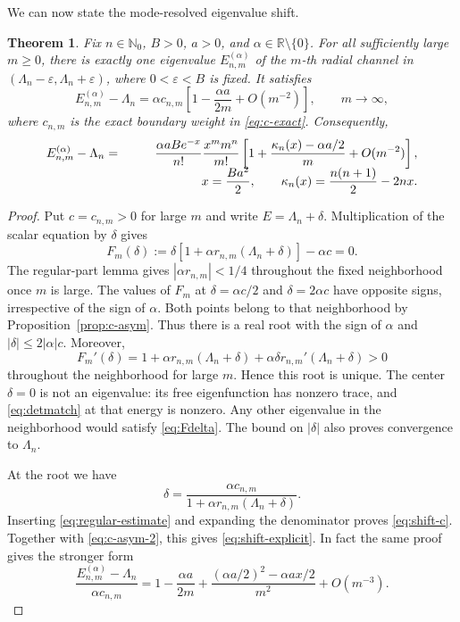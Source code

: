 \documentclass[12pt,a4paper]{article}
\numberwithin{equation}{section}
\newtheorem{thm}{Theorem}[section]
\theoremstyle{remark}
\theoremstyle{definition}
\newcommand{\R}{\mathbb R}
\newcommand{\N}{\mathbb N}
\begin{document}
We can now state the mode-resolved eigenvalue shift.

\begin{thm}\label{thm:shift}
Fix $n\in\N_0$, $B>0$, $a>0$, and $\alpha\in\R\setminus\{0\}$. For all
sufficiently large $m\ge0$, there is exactly one eigenvalue
$E_{n,m}^{(\alpha)}$ of the $m$-th radial channel in
$(\Lambda_n-\varepsilon,\Lambda_n+\varepsilon)$, where
$0<\varepsilon<B$ is fixed. It satisfies
\begin{equation}\label{eq:shift-c}
E_{n,m}^{(\alpha)}-\Lambda_n
=\alpha c_{n,m}
\left[1-\frac{\alpha a}{2m}+O(m^{-2})\right],
\qquad m\to\infty,
\end{equation}
where $c_{n,m}$ is the exact boundary weight in \eqref{eq:c-exact}. Consequently,
\begin{eqnarray}
E_{n,m}^{(\alpha)}-\Lambda_n
&=&\frac{\alpha aB e^{-x}}{n!}
\frac{x^m m^n}{m!}
\left[1+\frac{\kappa_n(x)-\alpha a/2}{m}
+O(m^{-2})\right],\label{eq:shift-explicit}
\\[-2mm]
&&\hspace{20mm} x=\frac{Ba^2}{2},\qquad
\kappa_n(x)=\frac{n(n+1)}2-2nx.\nonumber
\end{eqnarray}
\end{thm}

\begin{proof}
Put $c=c_{n,m}>0$ for large $m$ and write $E=\Lambda_n+\delta$.
Multiplication of the scalar equation by $\delta$ gives
\begin{equation}\label{eq:Fdelta}
F_m(\delta):=\delta[1+\alpha r_{n,m}(\Lambda_n+\delta)]-\alpha c=0.
\end{equation}
The regular-part lemma gives $|\alpha r_{n,m}|<1/4$ throughout the
fixed neighborhood once $m$ is large. The values of $F_m$ at $\delta=\alpha c/2$ and
$\delta=2\alpha c$ have opposite signs, irrespective of the sign of
$\alpha$.
Both points belong to that neighborhood by Proposition~\ref{prop:c-asym}.
Thus there is a real root with the sign of $\alpha$ and
$|\delta|\le2|\alpha|c$. Moreover,
$$
F_m'(\delta)=1+\alpha r_{n,m}(\Lambda_n+\delta)
+\alpha\delta r_{n,m}'(\Lambda_n+\delta)>0
$$
throughout the neighborhood for large $m$. Hence this root is unique.
The center $\delta=0$ is not an eigenvalue: its free eigenfunction has
nonzero trace, and \eqref{eq:detmatch} at that energy is nonzero.
Any other eigenvalue in the neighborhood would satisfy \eqref{eq:Fdelta}.
The bound on $|\delta|$ also proves convergence to $\Lambda_n$.

At the root we have
\begin{equation}\label{eq:delta-solve}
\delta=\frac{\alpha c_{n,m}}
{1+\alpha r_{n,m}(\Lambda_n+\delta)}.
\end{equation}
Inserting \eqref{eq:regular-estimate} and expanding the denominator proves
\eqref{eq:shift-c}. Together with \eqref{eq:c-asym-2}, this gives
\eqref{eq:shift-explicit}. In fact the same proof gives the stronger form
\begin{equation}\label{eq:shift-second}
\frac{E_{n,m}^{(\alpha)}-\Lambda_n}{\alpha c_{n,m}}
=1-\frac{\alpha a}{2m}
+\frac{(\alpha a/2)^2-\alpha ax/2}{m^2}+O(m^{-3}).
\end{equation}
\end{proof}
\end{document}
